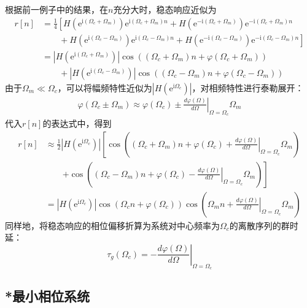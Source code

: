 \begin{example}
    根据前一例子中的结果，在$n$充分大时，稳态响应近似为
    \begin{align*}
        r[n]&=\frac{1}{4}\left[H(\mathrm{e}^{\mathrm{i}(\Omega_c+\Omega_m)})\mathrm{e}^{\mathrm{i}(\Omega_c+\Omega_m)n}+H(\mathrm{e}^{-\mathrm{i}(\Omega_c+\Omega_m)})\mathrm{e}^{-\mathrm{i}(\Omega_c+\Omega_m)n}\right.\\
        &\qquad +\left.H(\mathrm{e}^{\mathrm{i}(\Omega_c-\Omega_m)})\mathrm{e}^{\mathrm{i}(\Omega_c-\Omega_m)n}+H(\mathrm{e}^{-\mathrm{i}(\Omega_c-\Omega_m)})\mathrm{e}^{-\mathrm{i}(\Omega_c-\Omega_m)n}\right]\\
        &=|H(\mathrm{e}^{\mathrm{i}(\Omega_c+\Omega_m)})|\cos((\Omega_c+\Omega_m)n+\varphi(\Omega_c+\Omega_m))\\
        &\qquad +|H(\mathrm{e}^{\mathrm{i}(\Omega_c-\Omega_m)})|\cos((\Omega_c-\Omega_m)n+\varphi(\Omega_c-\Omega_m))
    \end{align*}
    由于$\Omega_m\ll\Omega_c$，可以将幅频特性近似为$|H(\mathrm{e}^{\mathrm{i}\Omega_c})|$，对相频特性进行泰勒展开：
    \begin{align*}
        \varphi(\Omega_c\pm\Omega_m)\approx \varphi(\Omega_c)\pm \left.\frac{d\varphi(\Omega)}{d\Omega}\right|_{\Omega=\Omega_c}\Omega_m
    \end{align*}
    代入$r[n]$的表达式中，得到
    \begin{align*}
        r[n]&\approx \frac{1}{2}|H(\mathrm{e}^{\mathrm{i}\Omega_c})|\left[\cos\left((\Omega_c+\Omega_m)n+\varphi(\Omega_c)+\left.\frac{d\varphi(\Omega)}{d\Omega}\right|_{\Omega=\Omega_c}\Omega_m\right)\right.\\
        &\qquad\left.+\cos\left((\Omega_c-\Omega_m)n+\varphi(\Omega_c)-\left.\frac{d\varphi(\Omega)}{d\Omega}\right|_{\Omega=\Omega_c}\Omega_m\right)\right]\\
        &=|H(\mathrm{e}^{\mathrm{i}\Omega_c})|\cos\left(\Omega_c n+\varphi(\Omega_c)\right)\cos\left(\Omega_m n+\left.\frac{d\varphi(\Omega)}{d\Omega}\right|_{\Omega=\Omega_c}\Omega_m\right)
    \end{align*}
    同样地，将稳态响应的相位偏移折算为系统对中心频率为$\Omega_c$的离散序列的群时延：
    $$\tau_g(\Omega_c)=-\left.\frac{d\varphi(\Omega)}{d\Omega}\right|_{\Omega=\Omega_c}$$
\end{example}

\subsection{*最小相位系统}\label{sub:minimum_phase}

